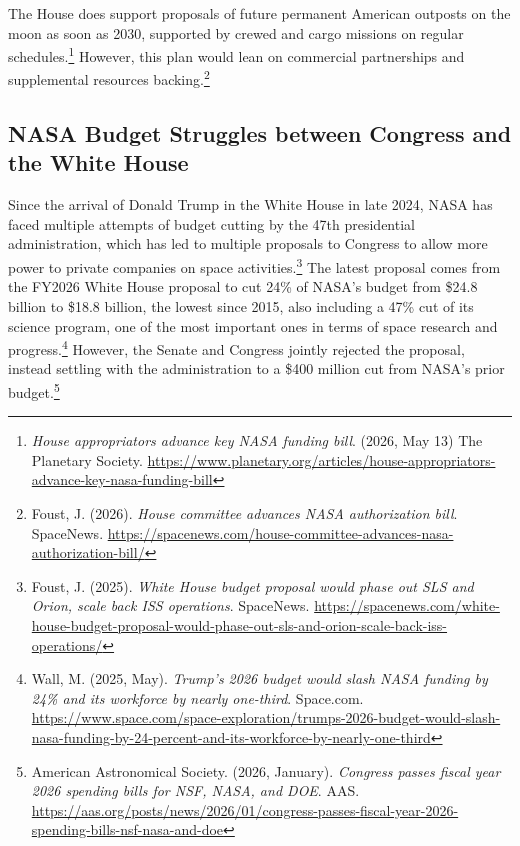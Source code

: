 The House does support proposals of future permanent American outposts on the moon as soon as 2030, supported by crewed and cargo missions on regular schedules.\footnote{\emph{House appropriators advance key NASA funding bill}. (2026, May 13) The Planetary Society. \url{https://www.planetary.org/articles/house-appropriators-advance-key-nasa-funding-bill}} However, this plan would lean on commercial partnerships and supplemental resources backing.\footnote{Foust, J. (2026). \emph{House committee advances NASA authorization bill}. SpaceNews. \url{https://spacenews.com/house-committee-advances-nasa-authorization-bill/}}

\subsection{NASA Budget Struggles between Congress and the White House}

Since the arrival of Donald Trump in the White House in late 2024, NASA has faced multiple attempts of budget cutting by the 47th presidential administration, which has led to multiple proposals to Congress to allow more power to private companies on space activities.\footnote{Foust, J. (2025). \emph{White House budget proposal would phase out SLS and Orion, scale back ISS operations}. SpaceNews. \url{https://spacenews.com/white-house-budget-proposal-would-phase-out-sls-and-orion-scale-back-iss-operations/}} The latest proposal comes from the FY2026 White House proposal to cut 24\% of NASA’s budget from \$24.8 billion to \$18.8 billion, the lowest since 2015, also including a 47\% cut of its science program, one of the most important ones in terms of space research and progress.\footnote{Wall, M. (2025, May). \emph{Trump's 2026 budget would slash NASA funding by 24\% and its workforce by nearly one-third}. Space.com. \url{https://www.space.com/space-exploration/trumps-2026-budget-would-slash-nasa-funding-by-24-percent-and-its-workforce-by-nearly-one-third}} However, the Senate and Congress jointly rejected the proposal, instead settling with the administration to a \$400 million cut from NASA’s prior budget.\footnote{American Astronomical Society. (2026, January). \emph{Congress passes fiscal year 2026 spending bills for NSF, NASA, and DOE}. AAS. \url{https://aas.org/posts/news/2026/01/congress-passes-fiscal-year-2026-spending-bills-nsf-nasa-and-doe}}

